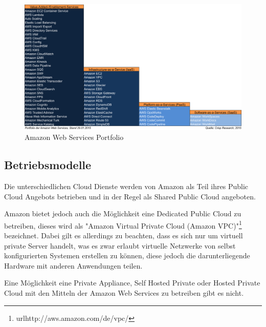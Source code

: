 \begin{figure}
	\centering
	\includegraphics[width=0.8\linewidth]{images/Crisp-AWS-Portfolio_201501291}
	\caption{Amazon Web Services Portfolio }
	\label{fig:amazon}
\end{figure}

\subsection{Betriebsmodelle}
\label{sec_amazon_deployment}
Die unterschiedlichen Cloud Dienste werden von Amazon als Teil ihres Public Cloud Angebots betrieben und in der Regel als Shared Public Cloud angeboten.

Amazon bietet jedoch auch die Möglichkeit eine Dedicated Public Cloud zu betreiben, dieses wird als "Amazon Virtual Private Cloud (Amazon VPC)"\footnote{url{http://aws.amazon.com/de/vpc/}} bezeichnet. Dabei gilt es allerdings zu beachten, dass es sich nur um virtuell private Server handelt, was es zwar erlaubt virtuelle Netzwerke von selbst konfigurierten Systemen erstellen zu können, diese jedoch die darunterliegende Hardware mit anderen Anwendungen teilen. 

Eine Möglichkeit eine Private Appliance, Self Hosted Private oder Hosted Private Cloud mit den Mitteln der Amazon Web Services zu betreiben gibt es nicht. \cite{amazonPrivate}

